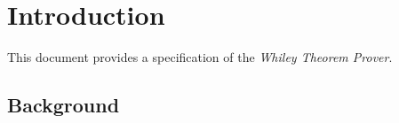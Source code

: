 \chapter{Introduction}

This document provides a specification of the {\em Whiley Theorem Prover}.  

\section{Background}

